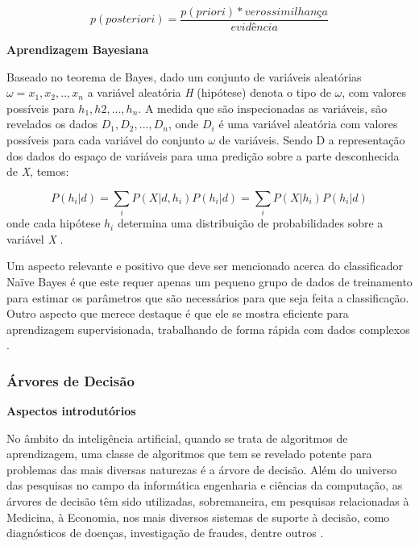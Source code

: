 \begin{equation}
p(posteriori) = \frac{p(priori) * verossimilhança}{evidência}
\end{equation}


\textbf{Aprendizagem Bayesiana}

Baseado no teorema de Bayes, dado um conjunto de variáveis aleatórias $\omega = {x_{1}, x_{2},..,x_{n}}$ a variável aleatória \textit{H} (hipótese) denota o tipo de $\omega$, com valores possíveis para $h_{1}, h{2},...,h_{n}$. A medida que são inspecionadas as variáveis, são revelados os dados $D_{1}, D_{2},...,D_{n}$, onde $D_{i}$ é uma variável aleatória com valores possíveis para cada variável do conjunto $\omega$ de variáveis. Sendo D a representação dos dados do espaço de variáveis para uma predição sobre a parte desconhecida de \textit{X}, temos:

\begin{equation}
P(h_{i}|d) = \sum_{i}P(X|d,h_{i})P(h_{i}|d) = \sum_{i}P(X|h_{i})P(h_{i}|d)
\end{equation}
 onde cada hipótese $h_{i}$ determina uma distribuição de probabilidades sobre a variável \textit{X} \cite{NorvigRussel2004}.

Um aspecto relevante e positivo que deve ser mencionado acerca do classificador Naïve Bayes é que este requer apenas um pequeno grupo de dados de treinamento para estimar os parâmetros que são necessários para que seja feita a classificação. Outro aspecto que merece destaque é que ele se mostra eficiente para aprendizagem supervisionada, trabalhando de forma rápida com dados complexos \cite{policarpo2015semantic}.


\pagebreak

\subsubsection{Árvores de Decisão}

\textbf{Aspectos introdutórios}

No âmbito da inteligência artificial, quando se trata de algoritmos de aprendizagem, uma classe de algoritmos que tem se revelado potente para problemas das mais diversas naturezas é a árvore de decisão. Além do universo das pesquisas no campo da informática engenharia e ciências da computação, as árvores de decisão têm sido utilizadas, sobremaneira, em pesquisas relacionadas à Medicina, à Economia, nos mais diversos sistemas de suporte à decisão, como diagnósticos de doenças, investigação de fraudes, dentre outros \cite{Camilo}.

